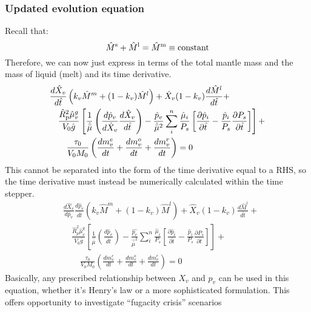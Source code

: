 \subsubsection{Updated evolution equation}
Recall that:
\begin{equation}
\hat{M}^{\rm s} + \hat{M}^{\rm l} = \hat{M}^{\rm m} \equiv \text{constant}
\label{eq:mantle_mass}
\end{equation}
Therefore, we can now just express in terms of the total mantle mass and the mass of liquid (melt) and its time derivative.   
\begin{align}
&\frac{d \hat{X}_v}{d\hat{t}} \left(k_v \hat{M}^m + (1-k_v) \hat{M}^l \right)
+ \hat{X}_v (1-k_v) \frac{d \hat{M}^l}{d\hat{t}} + \nonumber \\
&\quad \frac{\hat{R}_{\rm p}^2 \hat{\mu}_v^g}{V_0 \hat{g}}
\left[
 \frac{1}{\hat{\bar{\mu}}} \left( \frac{d \hat{p}_v}{d \hat{X}_v} \frac{d \hat{X}_v}{d \hat{t}} \right)
-\frac{\hat{p}_v}{\hat{\bar{\mu}}^2} \sum_i^n \frac{\hat{\mu}_i}{P_s} \left[ \frac{\partial \hat{p}_i}{\partial \hat{t}} - \frac{\hat{p}_i}{P_s} \frac{\partial P_s}{\partial \hat{t}} \right]
\right]+ \nonumber \\
& \qquad \frac{\tau_0}{V_0 M_0} \left( \frac{dm_v^e}{dt} +  \frac{dm_v^o}{dt} + \frac{dm_v^r}{dt} \right) = 0
\end{align}
This cannot be separated into the form of the time derivative equal to a RHS, so the time derivative must instead be numerically calculated within the time stepper.
\begin{align}
& \frac{d \hat{X}_v}{d\hat{p}_v} \frac{d \hat{p}_v}{d\hat{t}} \left(k_v \hat{M}^m + (1-k_v) \hat{M}^l \right)
+ \hat{X}_v (1-k_v) \frac{d \hat{M}^l}{d\hat{t}} + \nonumber \\
&\quad \frac{\hat{R}_p^2 \hat{\mu}_v^g}{V_0 \hat{g}}
\left[
\frac{1}{\hat{\bar{\mu}}} \left( \frac{d \hat{p}_v}{d \hat{t}} \right)
-\frac{\hat{p_v}}{\hat{\bar{\mu}}^2} \sum_i^n \frac{\hat{\mu}_i}{P_s} \left[ \frac{\partial \hat{p}_i}{\partial \hat{t}} - \frac{\hat{p}_i}{P_s} \frac{\partial P_s}{\partial \hat{t}} \right]
\right]+ \nonumber \\
& \qquad \frac{\tau_0}{V_0 M_0} \left( \frac{dm_v^e}{dt} +  \frac{dm_v^o}{dt} + \frac{dm_v^r}{dt} \right) = 0
\end{align}
Basically, any prescribed relationship between $X_v$ and $p_v$ can be used in this equation, whether it's Henry's law or a more sophisticated formulation.  This offers opportunity to investigate ``fugacity crisis'' scenarios \citep{KFS19,KFS20}
